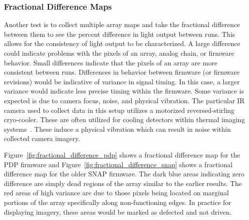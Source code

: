        \subsubsection{Fractional Difference Maps}

            Another test is to collect multiple array maps and take the fractional difference between them to see the percent difference in light output between runs. This allows for the consistency of light output to be characterized. A large difference could indicate problems with the pixels of an array, analog chain, or firmware behavior. Small differences indicate that the pixels of an array are more consistent between runs. Differences in behavior between firmware (or firmware revisions) would be indicative of variance in signal timing. In this case, a larger variance would indicate less precise timing within the firmware. Some variance is expected is due to camera focus, noise, and physical vibration. The particular IR camera used to collect data in this setup utilizes a motorized reversed-stirling cryo-cooler. These are often utilized for cooling detectors within thermal imaging systems~\cite{Organ1999}. These induce a physical vibration which can result in noise within collected camera imagery.

            Figure~\ref{fig:fractional_difference_pdp} shows a fractional difference map for the PDP firmware and Figure~\ref{fig:fractional_difference_snap} shows a fractional difference map for the older SNAP firmware. The dark blue areas indicating zero difference are simply dead regions of the array similar to the earlier results. The red areas of high variance are due to those pixels being located on marginal portions of the array specifically along non-functioning edges. In practice for displaying imagery, these areas would be marked as defected and not driven.

